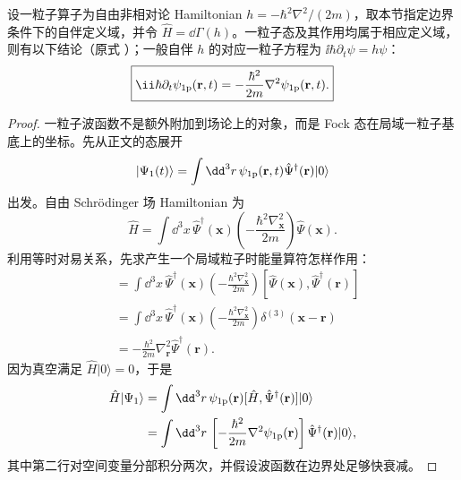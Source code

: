 \begin{proposition}[二次量子化在一粒子空间上的限制]
设一粒子算子为自由非相对论 Hamiltonian $h=-\hbar^2\nabla^2/(2m)$，取本节指定边界条件下的自伴定义域，并令 $\hat H=\dd\Gamma(h)$。一粒子态及其作用均属于相应定义域，则有以下结论（原式 ）；一般自伴 $h$ 的对应一粒子方程为 $\ii\hbar\partial_t\psi=h\psi$：
\begin{equation*}
 \boxed{
 \ii\hbar\partial_t\psi_{\rm 1p}(\mathbf r,t)
 =-\frac{\hbar^2}{2m}\nabla^2\psi_{\rm 1p}(\mathbf r,t).}
\end{equation*}
\end{proposition}
\begin{proof}
一粒子波函数不是额外附加到场论上的对象，而是 Fock 态在局域一粒子基底上的坐标。先从正文的态展开
\begin{equation*}
|\Psi_1(t)\rangle
=\int\dd^3r\,\psi_{\rm 1p}(\mathbf r,t)
\hat\Psi^\dagger(\mathbf r)|0\rangle
\end{equation*}
出发。自由 Schr\"odinger 场 Hamiltonian 为
\begin{equation*}
\hat H
=\int\dd^3x\,
\hat\Psi^\dagger(\mathbf x)
\left(-\frac{\hbar^2\nabla_{\mathbf x}^2}{2m}\right)
\hat\Psi(\mathbf x).
\end{equation*}
利用等时对易关系，先求产生一个局域粒子时能量算符怎样作用：
\begin{align*}
[\hat H,\hat\Psi^\dagger(\mathbf r)]
&=\int\dd^3x\,
\hat\Psi^\dagger(\mathbf x)
\left(-\frac{\hbar^2\nabla_{\mathbf x}^2}{2m}\right)
[\hat\Psi(\mathbf x),\hat\Psi^\dagger(\mathbf r)]\\
&=\int\dd^3x\,
\hat\Psi^\dagger(\mathbf x)
\left(-\frac{\hbar^2\nabla_{\mathbf x}^2}{2m}\right)
\delta^{(3)}(\mathbf x-\mathbf r)\\
&=-\frac{\hbar^2}{2m}\nabla_{\mathbf r}^2
\hat\Psi^\dagger(\mathbf r).
\end{align*}
因为真空满足 \(\hat H|0\rangle=0\)，于是
\begin{align*}
\hat H|\Psi_1\rangle
&=\int\dd^3r\,\psi_{\rm 1p}(\mathbf r)
[\hat H,\hat\Psi^\dagger(\mathbf r)]|0\rangle\\
&=\int\dd^3r\,
\left[-\frac{\hbar^2}{2m}\nabla^2\psi_{\rm 1p}(\mathbf r)\right]
\hat\Psi^\dagger(\mathbf r)|0\rangle,
\end{align*}
其中第二行对空间变量分部积分两次，并假设波函数在边界处足够快衰减。


\end{proof}
